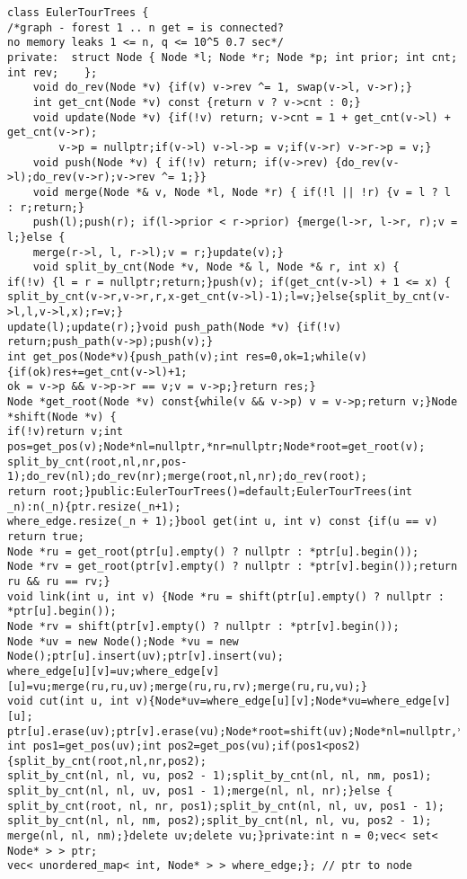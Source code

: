 \documentclass[12pt]{article}
\begin{document}
\begin{verbatim}
class EulerTourTrees {
/*graph - forest 1 .. n get = is connected?
no memory leaks 1 <= n, q <= 10^5 0.7 sec*/
private:  struct Node { Node *l; Node *r; Node *p; int prior; int cnt; int rev;    };
    void do_rev(Node *v) {if(v) v->rev ^= 1, swap(v->l, v->r);}
    int get_cnt(Node *v) const {return v ? v->cnt : 0;}
    void update(Node *v) {if(!v) return; v->cnt = 1 + get_cnt(v->l) + get_cnt(v->r);
        v->p = nullptr;if(v->l) v->l->p = v;if(v->r) v->r->p = v;}
    void push(Node *v) { if(!v) return; if(v->rev) {do_rev(v->l);do_rev(v->r);v->rev ^= 1;}}
    void merge(Node *& v, Node *l, Node *r) { if(!l || !r) {v = l ? l : r;return;}
    push(l);push(r); if(l->prior < r->prior) {merge(l->r, l->r, r);v = l;}else {
    merge(r->l, l, r->l);v = r;}update(v);}
    void split_by_cnt(Node *v, Node *& l, Node *& r, int x) {
if(!v) {l = r = nullptr;return;}push(v); if(get_cnt(v->l) + 1 <= x) {
split_by_cnt(v->r,v->r,r,x-get_cnt(v->l)-1);l=v;}else{split_by_cnt(v->l,l,v->l,x);r=v;}
update(l);update(r);}void push_path(Node *v) {if(!v) return;push_path(v->p);push(v);}
int get_pos(Node*v){push_path(v);int res=0,ok=1;while(v){if(ok)res+=get_cnt(v->l)+1;
ok = v->p && v->p->r == v;v = v->p;}return res;}
Node *get_root(Node *v) const{while(v && v->p) v = v->p;return v;}Node *shift(Node *v) {
if(!v)return v;int pos=get_pos(v);Node*nl=nullptr,*nr=nullptr;Node*root=get_root(v);
split_by_cnt(root,nl,nr,pos-1);do_rev(nl);do_rev(nr);merge(root,nl,nr);do_rev(root);
return root;}public:EulerTourTrees()=default;EulerTourTrees(int _n):n(_n){ptr.resize(_n+1);
where_edge.resize(_n + 1);}bool get(int u, int v) const {if(u == v) return true;
Node *ru = get_root(ptr[u].empty() ? nullptr : *ptr[u].begin());
Node *rv = get_root(ptr[v].empty() ? nullptr : *ptr[v].begin());return ru && ru == rv;}
void link(int u, int v) {Node *ru = shift(ptr[u].empty() ? nullptr : *ptr[u].begin());
Node *rv = shift(ptr[v].empty() ? nullptr : *ptr[v].begin());
Node *uv = new Node();Node *vu = new Node();ptr[u].insert(uv);ptr[v].insert(vu);
where_edge[u][v]=uv;where_edge[v][u]=vu;merge(ru,ru,uv);merge(ru,ru,rv);merge(ru,ru,vu);}
void cut(int u, int v){Node*uv=where_edge[u][v];Node*vu=where_edge[v][u];
ptr[u].erase(uv);ptr[v].erase(vu);Node*root=shift(uv);Node*nl=nullptr,*nm=nullptr,*nr=nullptr;
int pos1=get_pos(uv);int pos2=get_pos(vu);if(pos1<pos2){split_by_cnt(root,nl,nr,pos2);
split_by_cnt(nl, nl, vu, pos2 - 1);split_by_cnt(nl, nl, nm, pos1);
split_by_cnt(nl, nl, uv, pos1 - 1);merge(nl, nl, nr);}else {
split_by_cnt(root, nl, nr, pos1);split_by_cnt(nl, nl, uv, pos1 - 1);
split_by_cnt(nl, nl, nm, pos2);split_by_cnt(nl, nl, vu, pos2 - 1);
merge(nl, nl, nm);}delete uv;delete vu;}private:int n = 0;vec< set< Node* > > ptr;
vec< unordered_map< int, Node* > > where_edge;}; // ptr to node
\end{verbatim}
\end{document}
